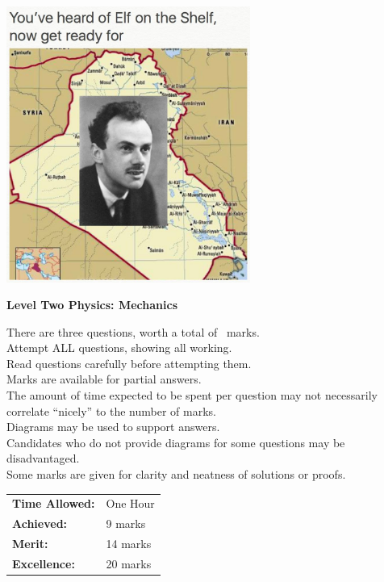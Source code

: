\documentclass[a4paper,addpoints]{exam}
\begin{document}
\begin{coverpages}

\begin{center}
  \includegraphics[width=0.6\textwidth]{mech_cover}

  \vspace{5mm}

  \textbf{\Huge{Level Two Physics: Mechanics}}
\end{center}

\vspace{5mm}

\noindent
\large{There are three questions, worth a total of \numpoints\ marks.\\
       Attempt ALL questions, showing all working.\\
       Read questions carefully before attempting them.\\
       Marks are available for partial answers.\\
       The amount of time expected to be spent per question may not necessarily correlate ``nicely'' to the number of marks.\\
       Diagrams may be used to support answers.\\
       Candidates who do not provide diagrams for some questions may be disadvantaged.\\
       Some marks are given for clarity and neatness of solutions or proofs.}
\vspace{2mm}

\vfill

\begin{flushright}
  \begin{tabular}{ll}
    \textbf{Time Allowed:}& One Hour\\
    \textbf{Achieved:}& 9 marks\\
    \textbf{Merit:}& 14 marks\\
    \textbf{Excellence:}& 20 marks
  \end{tabular}

  \gradetable[v][questions]
\end{flushright}

\end{coverpages}
\end{document}
